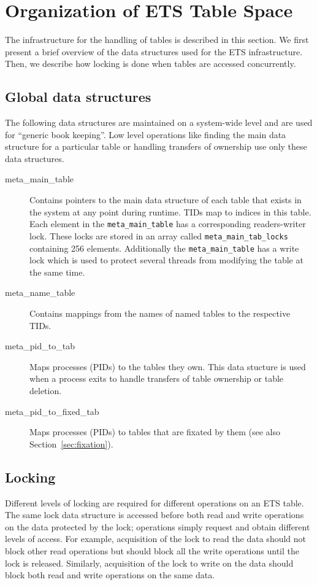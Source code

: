 \documentclass[aps,pre,preprint,nofootinbib]{revtex4}
\begin{document}
\section{Organization  of ETS Table Space}

The infrastructure for the handling of tables is described in this section.
We first present a brief overview of the data structures used for the ETS infrastructure.
Then, we describe how locking is done when tables are accessed concurrently.

\subsection{Global data structures}
\label{sec:tables_overview}

The following data structures are maintained on a system-wide level and are used for ``generic book keeping''.
Low level operations like finding the main data structure for a particular table or handling transfers of ownership use only these data structures.

\begin{description}
\item[meta\_main\_table]
  Contains pointers to the main data structure of each table that exists in the system at any point during runtime.
  TIDs map to indices in this table.
  Each element in the \verb|meta_main_table| has a corresponding readers-writer lock. 
  These locks are stored in an array called \verb|meta_main_tab_locks| containing 256 elements.
  Additionally the \verb|meta_main_table| has a write lock which is used to protect several threads from modifying the table at the same time.
\item[meta\_name\_table]
  Contains mappings from the names of named tables to the respective TIDs.
\item[meta\_pid\_to\_tab]
  Maps processes (PIDs) to the tables they own.
  This data stucture is used when a process exits to handle transfers of table ownership or table deletion.
\item[meta\_pid\_to\_fixed\_tab]
  Maps processes (PIDs) to tables that are fixated by them (see also Section~\ref{sec:fixation}).
\end{description}

\subsection{Locking} \label{sec:tables_locking}

Different levels of locking are required for different operations on an ETS table.
The same lock data structure is accessed before both read and write operations on the data protected by the lock; operations simply request and obtain different levels of access.
For example, acquisition of the lock to read the data should not block other read operations but should block all the write operations until the lock is released.
Similarly, acquisition of the lock to write on the data should block both read and write operations on the same data.
\end{document}
